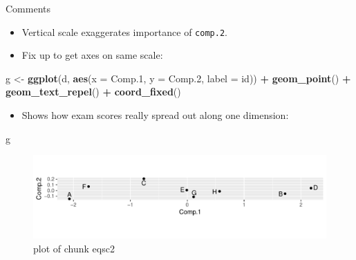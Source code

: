 \documentclass[ignorenonframetext,]{beamer}
\newenvironment{Shaded}{\begin{snugshade}}{\end{snugshade}}
\newcommand{\DataTypeTok}[1]{\textcolor[rgb]{0.13,0.29,0.53}{#1}}
\newcommand{\FloatTok}[1]{\textcolor[rgb]{0.00,0.00,0.81}{#1}}
\newcommand{\KeywordTok}[1]{\textcolor[rgb]{0.13,0.29,0.53}{\textbf{#1}}}
\newcommand{\NormalTok}[1]{#1}
\newcommand{\OperatorTok}[1]{\textcolor[rgb]{0.81,0.36,0.00}{\textbf{#1}}}
\newcommand{\StringTok}[1]{\textcolor[rgb]{0.31,0.60,0.02}{#1}}
\providecommand{\tightlist}{%
  \setlength{\itemsep}{0pt}\setlength{\parskip}{0pt}}
\begin{document}
\begin{frame}[fragile]{Comments}
\protect\hypertarget{comments-27}{}

\begin{itemize}
\item
  Vertical scale exaggerates importance of \texttt{comp.2}.
\item
  Fix up to get axes on same scale:
\end{itemize}

\begin{Shaded}
\begin{Highlighting}[]
\NormalTok{g <-}\StringTok{ }\KeywordTok{ggplot}\NormalTok{(d, }\KeywordTok{aes}\NormalTok{(}\DataTypeTok{x =}\NormalTok{ Comp}\FloatTok{.1}\NormalTok{, }\DataTypeTok{y =}\NormalTok{ Comp}\FloatTok{.2}\NormalTok{, }\DataTypeTok{label =}\NormalTok{ id)) }\OperatorTok{+}
\StringTok{  }\KeywordTok{geom_point}\NormalTok{() }\OperatorTok{+}\StringTok{ }\KeywordTok{geom_text_repel}\NormalTok{() }\OperatorTok{+}
\StringTok{  }\KeywordTok{coord_fixed}\NormalTok{()}
\end{Highlighting}
\end{Shaded}

\begin{itemize}
\tightlist
\item
  Shows how exam scores really spread out along one dimension:
\end{itemize}

\begin{Shaded}
\begin{Highlighting}[]
\NormalTok{g}
\end{Highlighting}
\end{Shaded}

\begin{figure}
\centering
\includegraphics{figure/eqsc2-1.pdf}
\caption{plot of chunk eqsc2}
\end{figure}

\end{frame}
\end{document}
